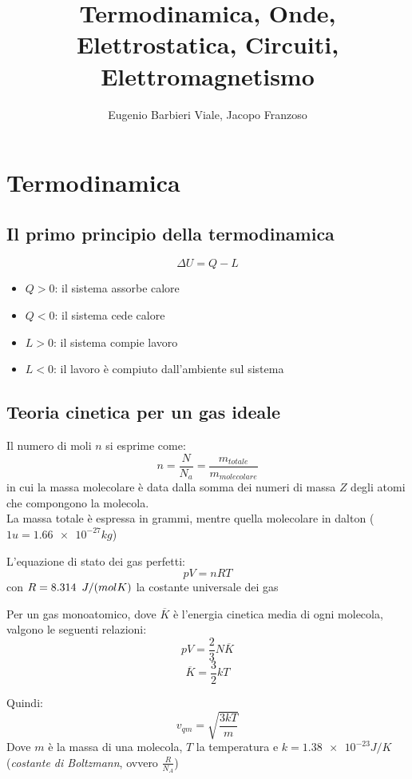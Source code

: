 \documentclass[12pt]{article}
\title{Termodinamica, Onde, Elettrostatica, Circuiti, Elettromagnetismo}
\author{Eugenio Barbieri Viale, Jacopo Franzoso}
\date{}
\begin{document}
\setlength{\parindent}{0pt}
\maketitle
\tableofcontents

\newpage
\section{Termodinamica}

\subsection{Il primo principio della termodinamica}
$$ \Delta U = Q - L $$
\begin{itemize}
    \item $Q > 0$: il sistema assorbe calore
    \item $Q < 0$: il sistema cede calore
    \item $L > 0$: il sistema compie lavoro 
    \item $L < 0$: il lavoro è compiuto dall'ambiente sul sistema
\end{itemize}

\subsection{Teoria cinetica per un gas ideale}
Il numero di moli $n$ si esprime come:
$$ n = \frac{N}{N_a} = \frac{m_{totale}}{m_{molecolare}} $$
in cui la massa molecolare è data dalla somma dei numeri di massa $Z$ degli atomi che compongono la molecola. \\
La massa totale è espressa in grammi, mentre quella molecolare in dalton ($1u = \num{1.66e-27} kg$)

\vspace{1em}

L'equazione di stato dei gas perfetti:
$$ pV = nRT $$
con $R = 8.314 \hspace{0.5em}J/(molK)$ la costante universale dei gas

\vspace{1em}

Per un gas monoatomico, dove $\overline{K}$ è l'energia cinetica media di ogni molecola, valgono le seguenti relazioni:
$$ pV = \frac{2}{3}N\overline{K} $$
$$ \overline{K} = \frac{3}{2}kT $$ 

\vspace{1em}

Quindi:
$$ v_{qm} = \sqrt{\frac{3kT}{m}} $$
Dove $m$ è la massa di una molecola, $T$ la temperatura e $k = \num{1.38e-23} J/K$ (\textit{costante di Boltzmann}, ovvero $\frac{R}{N_A}$)
\end{document}
